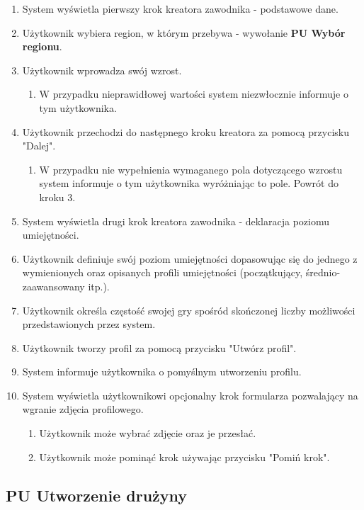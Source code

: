 \begin{enumerate}
  \item System wyświetla pierwszy krok kreatora zawodnika - podstawowe dane.
  \item Użytkownik wybiera region, w którym przebywa - wywołanie \textbf{PU Wybór regionu}.
  \item Użytkownik wprowadza swój wzrost.
  \begin{enumerate}[label=(\alph*)]
     \item W przypadku nieprawidłowej wartości system niezwłocznie informuje o tym użytkownika.
   \end{enumerate}
  \item Użytkownik przechodzi do następnego kroku kreatora za pomocą przycisku "Dalej".
  \begin{enumerate}[label=(\alph*)]
     \item W przypadku nie wypełnienia wymaganego pola dotyczącego wzrostu system informuje o tym użytkownika wyróżniając to pole. Powrót do kroku 3.
   \end{enumerate}
     
  \item System wyświetla drugi krok kreatora zawodnika - deklaracja poziomu umiejętności.
  \item Użytkownik definiuje swój poziom umiejętności dopasowując się do jednego z wymienionych oraz opisanych profili umiejętności (początkujący, średnio-zaawansowany itp.).
  \item Użytkownik określa częstość swojej gry spośród skończonej liczby możliwości przedstawionych przez system.
  \item Użytkownik tworzy profil za pomocą przycisku "Utwórz profil".
  \item System informuje użytkownika o pomyślnym utworzeniu profilu.
  \item System wyświetla użytkownikowi opcjonalny krok formularza pozwalający na wgranie zdjęcia profilowego.
 
  \begin{enumerate}[label=(\alph*)]
     \item Użytkownik może wybrać zdjęcie oraz je przesłać.
     \item Użytkownik może pominąć krok używając przycisku "Pomiń krok".
   \end{enumerate}
\end{enumerate}

\subsection{PU Utworzenie drużyny}

